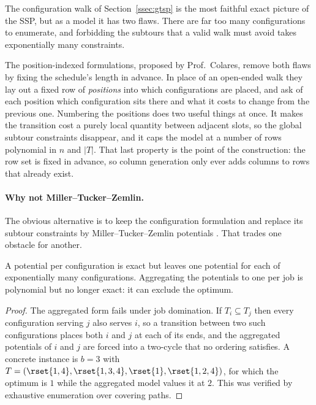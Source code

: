The configuration walk of Section~\ref{ssec:gtsp} is the most faithful exact picture
of the SSP, but as a model it has two flaws. There are far too many configurations to
enumerate, and forbidding the subtours that a valid walk must avoid takes exponentially
many constraints.

The position-indexed formulations, proposed by Prof.~Colares, remove both flaws by
fixing the schedule's length in advance. In place of an open-ended walk they lay out a
fixed row of \emph{positions} into which configurations are placed, and ask of each
position which configuration sits there and what it costs to change from the previous
one. Numbering the positions does two useful things at once. It makes the transition
cost a purely local quantity between adjacent slots, so the global subtour constraints
disappear, and it caps the model at a number of rows polynomial in $n$ and
$\lvert T\rvert$. That last property is the point of the construction: the row set is
fixed in advance, so column generation only ever adds columns to rows that already
exist.

\paragraph{Why not Miller--Tucker--Zemlin.}
The obvious alternative is to keep the configuration formulation and replace its
subtour constraints by Miller--Tucker--Zemlin potentials
\citep{Miller1960,DesrochersLaporte1991}. That trades one obstacle for another.

\begin{proposition}\label{prop:mtz}
A potential per configuration is exact but leaves one potential for each of
exponentially many configurations. Aggregating the potentials to one per job is
polynomial but no longer exact: it can exclude the optimum.
\end{proposition}

\begin{proof}
The aggregated form fails under job domination. If $T_i\subseteq T_j$ then every
configuration serving $j$ also serves $i$, so a transition between two such
configurations places both $i$ and $j$ at each of its ends, and the aggregated
potentials of $i$ and $j$ are forced into a two-cycle that no ordering satisfies. A
concrete instance is $b=3$ with $T=(\rset{1,4},\rset{1,3,4},\rset{1},\rset{1,2,4})$,
for which the optimum is $1$ while the aggregated model values it at $2$. This was
verified by exhaustive enumeration over covering paths.
\end{proof}

